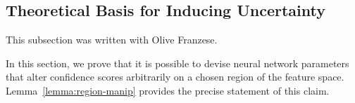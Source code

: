 %            	
%            	
%
%




\subsection{Theoretical Basis for Inducing Uncertainty} 

\begin{contriback}
This subsection was written with Olive Franzese.
\end{contriback}

In this section, we prove that it is possible to devise neural network parameters that alter confidence scores arbitrarily on a chosen region of the feature space. Lemma~\ref{lemma:region-manip} provides the precise statement of this claim.

